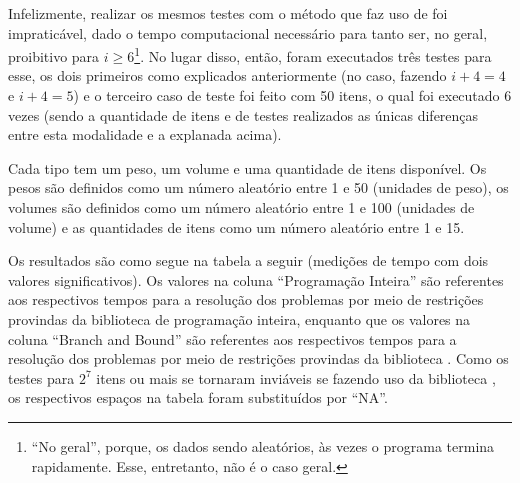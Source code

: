 Infelizmente, realizar os mesmos testes com o método que faz uso de
 foi impraticável, dado o tempo
computacional necessário para tanto ser, no geral, proibitivo para
$i \geq 6$\footnote{``No geral'', porque, os dados sendo aleatórios,
  às vezes o programa termina rapidamente. Esse, entretanto, não é o
  caso geral.}. No lugar disso, então, foram executados três testes
para esse, os dois primeiros como explicados anteriormente (no caso,
fazendo $i + 4 = 4$ e $i + 4 = 5$) e o terceiro caso de teste foi
feito com 50 itens, o qual foi executado 6 vezes (sendo a quantidade de
itens e de testes realizados as únicas diferenças entre esta
modalidade e a explanada acima).

Cada tipo tem um peso, um volume e uma quantidade de itens
disponível. Os pesos são definidos como um número aleatório entre 1 e
50 (unidades de peso), os volumes são definidos como um número
aleatório entre 1 e 100 (unidades de volume) e as quantidades de itens
como um número aleatório entre 1 e 15.

Os resultados são como segue na tabela a seguir (medições de tempo com
dois valores significativos). Os valores na coluna ``Programação
Inteira'' são referentes aos respectivos tempos para a resolução dos
problemas por meio de restrições provindas da biblioteca
 de programação inteira, enquanto que os valores na
coluna ``Branch and Bound'' são referentes aos respectivos tempos para
a resolução dos problemas por meio de restrições provindas da
biblioteca . Como os testes para $2^7$
itens ou mais se tornaram inviáveis se fazendo uso da biblioteca
, os respectivos espaços na tabela foram
substituídos por ``NA''.

